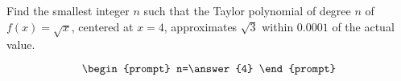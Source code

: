 \documentclass{ximera}
\author{Gregory Hartman \and Matthew Carr}
\begin{document}
\begin{exercise}





Find the smallest integer $n$ such that the Taylor polynomial of degree $n$ of $f(x)=\sqrt{x}$, centered at $x=4$, approximates $\sqrt{3}$ within $0.0001$ of the actual value. 

\[
\begin{prompt}
n=\answer{4}
\end{prompt}
\]

\end{exercise}
\end{document}
